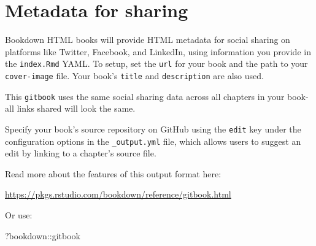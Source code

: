 \documentclass[
]{book}
\newenvironment{Shaded}{\begin{snugshade}}{\end{snugshade}}
\newcommand{\NormalTok}[1]{#1}
\newcommand{\SpecialCharTok}[1]{\textcolor[rgb]{0.00,0.00,0.00}{#1}}
\begin{document}
\hypertarget{metadata-for-sharing}{%
\section{Metadata for sharing}\label{metadata-for-sharing}}

Bookdown HTML books will provide HTML metadata for social sharing on platforms like Twitter, Facebook, and LinkedIn, using information you provide in the \texttt{index.Rmd} YAML. To setup, set the \texttt{url} for your book and the path to your \texttt{cover-image} file. Your book's \texttt{title} and \texttt{description} are also used.

This \texttt{gitbook} uses the same social sharing data across all chapters in your book- all links shared will look the same.

Specify your book's source repository on GitHub using the \texttt{edit} key under the configuration options in the \texttt{\_output.yml} file, which allows users to suggest an edit by linking to a chapter's source file.

Read more about the features of this output format here:

\url{https://pkgs.rstudio.com/bookdown/reference/gitbook.html}

Or use:

\begin{Shaded}
\begin{Highlighting}[]
\NormalTok{?bookdown}\SpecialCharTok{::}\NormalTok{gitbook}
\end{Highlighting}
\end{Shaded}


  
\end{document}
